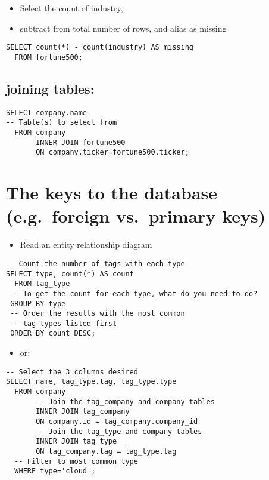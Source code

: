 \documentclass[]{book}
\providecommand{\tightlist}{%
  \setlength{\itemsep}{0pt}\setlength{\parskip}{0pt}}
\begin{document}
\begin{itemize}
\tightlist
\item
  Select the count of industry,
\item
  subtract from total number of rows, and alias as missing
\end{itemize}

\begin{verbatim}
SELECT count(*) - count(industry) AS missing
  FROM fortune500;
\end{verbatim}

\hypertarget{joining-tables}{%
\subsection{joining tables:}\label{joining-tables}}

\begin{verbatim}
SELECT company.name 
-- Table(s) to select from
  FROM company 
       INNER JOIN fortune500 
       ON company.ticker=fortune500.ticker;
\end{verbatim}

\hypertarget{the-keys-to-the-database-e.g.foreign-vs.primary-keys}{%
\section{The keys to the database (e.g.~foreign vs.~primary keys)}\label{the-keys-to-the-database-e.g.foreign-vs.primary-keys}}

\begin{itemize}
\tightlist
\item
  Read an entity relationship diagram
\end{itemize}

\begin{verbatim}
-- Count the number of tags with each type
SELECT type, count(*) AS count
  FROM tag_type
 -- To get the count for each type, what do you need to do?
 GROUP BY type
 -- Order the results with the most common
 -- tag types listed first
 ORDER BY count DESC;
\end{verbatim}

\begin{itemize}
\tightlist
\item
  or:
\end{itemize}

\begin{verbatim}
-- Select the 3 columns desired
SELECT name, tag_type.tag, tag_type.type
  FROM company
  	   -- Join the tag_company and company tables
       INNER JOIN tag_company 
       ON company.id = tag_company.company_id
       -- Join the tag_type and company tables
       INNER JOIN tag_type
       ON tag_company.tag = tag_type.tag
  -- Filter to most common type
  WHERE type='cloud';
\end{verbatim}
\end{document}
